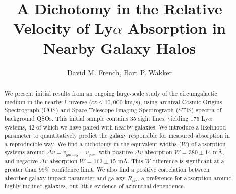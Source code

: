 \documentclass[iop]{emulateapj-rtx4}
\begin{document}

\title{A Dichotomy in the Relative Velocity of Ly$\alpha$ Absorption in Nearby Galaxy Halos}
\author{David M. French, Bart P. Wakker}



\begin{abstract}

We present initial results from an ongoing large-scale study of the circumgalactic medium in the nearby Universe ($cz \leq 10,000$ km/s), using archival Cosmic Origins Spectrograph (COS) and Space Telescope Imaging Spectrograph (STIS) spectra of background QSOs. This initial sample contains 35 sight lines, yielding 175 Ly$\alpha$ systems, 42 of which we have paired with nearby galaxies. We introduce a likelihood parameter to quantitatively predict the galaxy responsible for measured absorption in a reproducible way. We find a dichotomy in the equivalent widths ($W$) of absorption systems around $\Delta v = v_{galaxy} - v_{gas}$, with positive $\Delta v$ absorption $W$ = $380 \pm 14$ m\AA, and negative $\Delta v$  absorption $W$ = $163 \pm 15$ m\AA. This $W$ difference is significant at a greater than $99\%$ confidence limit. We also find a positive correlation between absorber-galaxy impact parameter and galaxy $R_{vir}$, a preference for absorption around highly inclined galaxies, but little evidence of azimuthal dependence.



\end{abstract}


%
\end{document}
